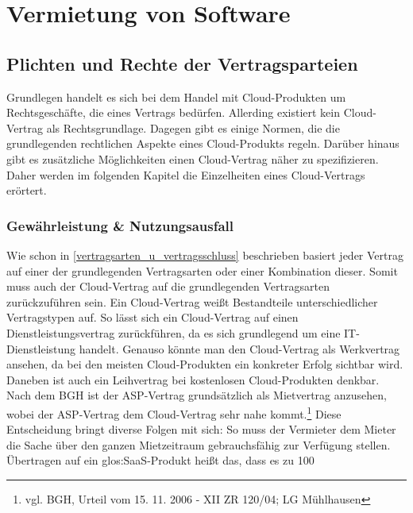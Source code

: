 \chapter{Vermietung von Software}
\section{Plichten und Rechte der Vertragsparteien}
Grundlegen handelt es sich bei dem Handel mit Cloud-Produkten um Rechtsgesch\"afte, die eines Vertrags bed\"urfen. Allerding existiert kein {\glqq}Cloud-Vertrag{\grqq} als Rechtsgrundlage. Dagegen gibt es einige Normen, die die grundlegenden rechtlichen Aspekte eines Cloud-Produkts regeln. Dar\"uber hinaus gibt es zus\"atzliche M\"oglichkeiten einen {\glqq}Cloud-Vertrag{\grqq} n\"aher zu spezifizieren. Daher werden im folgenden Kapitel die Einzelheiten eines {\glqq}Cloud-Vertrags{\grqq} er\"ortert.

  \subsection{Gew\"ahrleistung \& Nutzungsausfall}
Wie schon in \vref{vertragsarten_u_vertragsschluss} beschrieben basiert jeder Vertrag auf einer der grundlegenden Vertragsarten oder einer Kombination dieser. Somit muss auch der {\glqq}Cloud-Vertrag{\grqq} auf die grundlegenden Vertragsarten zur\"uckzuf\"uhren sein.  Ein {\glqq}Cloud-Vertrag{\grqq} wei{\ss}t Bestandteile unterschiedlicher Vertragstypen auf. So l\"asst sich ein {\glqq}Cloud-Vertrag{\grqq} auf einen Dienstleistungsvertrag zur\"uckf\"uhren, da es sich grundlegend um eine IT-Dienstleistung handelt. Genauso k\"onnte man den {\glqq}Cloud-Vertrag{\grqq} als Werkvertrag ansehen, da bei den meisten Cloud-Produkten ein konkreter Erfolg sichtbar wird. Daneben ist auch ein Leihvertrag bei kostenlosen Cloud-Produkten denkbar. Nach dem BGH ist der ASP-Vertrag grunds\"atzlich als Mietvertrag anzusehen, wobei der ASP-Vertrag dem {\glqq}Cloud-Vertrag{\grqq} sehr nahe kommt.\footnote{vgl. BGH, Urteil vom 15. 11. 2006 - XII ZR 120/04; LG M\"uhlhausen} 
Diese Entscheidung bringt diverse Folgen mit sich:\newline
So muss der Vermieter dem Mieter die Sache \"uber den ganzen Mietzeitraum gebrauchsf\"ahig zur Verf\"ugung stellen. \"Ubertragen auf ein \gls{glos:SaaS}-Produkt hei{\ss}t das, dass es zu 100%
